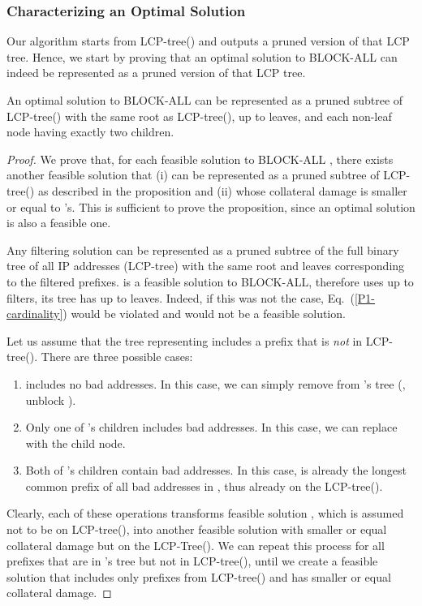 \subsubsection*{Characterizing an Optimal Solution}
Our algorithm starts from LCP-tree() and outputs a pruned version of that LCP tree.
Hence, we start by proving that an optimal solution to BLOCK-ALL can indeed be represented as a pruned version of that LCP tree.

\begin{proposition}\label{prop:all}
An optimal solution to BLOCK-ALL can be represented as a pruned
subtree of LCP-tree() with the same root as LCP-tree(), up to  leaves,
and each non-leaf node having exactly two children.
\end{proposition}

\begin{proof}
We prove that, for each feasible solution to BLOCK-ALL , there exists another feasible solution 
that (i) can be represented as a pruned subtree of LCP-tree() as described
in the proposition and (ii) whose collateral damage is smaller or equal to 's.
This is sufficient to prove the proposition, since an optimal solution is also a feasible one.

Any filtering solution can be represented as a pruned subtree of
the full binary tree of all IP addresses (LCP-tree)
with the same root and leaves corresponding to the filtered prefixes.
 is a feasible solution to BLOCK-ALL, therefore 
 uses up to  filters, \ie its tree has up to  leaves. Indeed, if this was not the case,
Eq.~(\ref{P1-cardinality}) would be violated and  would not be a feasible solution.

Let us assume that the tree  representing  includes a prefix  that is {\em not} in LCP-tree(). There are three possible cases:
\begin{enumerate}
\item  includes no bad addresses.
In this case, we can simply remove  from 's tree (\ie, unblock ).
\item Only one of 's children includes bad addresses.
In this case, we can replace  with the child node.
\item Both of 's children contain bad addresses. In this case,  is already the longest common prefix of all bad addresses in , thus already on the LCP-tree().
\end{enumerate}
Clearly, each of these operations transforms feasible solution , which is assumed not to be on LCP-tree(), into another feasible solution  with smaller or equal collateral damage but on the LCP-Tree(). We can repeat this process for all prefixes that are in 's tree but not in LCP-tree(), until we create a feasible solution  that includes only prefixes from LCP-tree() and has smaller or equal collateral damage.



\end{proof}
